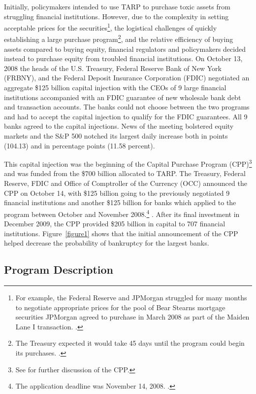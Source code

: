 \documentclass[12pt]{article}
\begin{document}
Initially, policymakers intended to use TARP to purchase toxic assets from struggling financial institutions. However, due to the complexity in setting acceptable prices for the securities\footnote{For example, the Federal Reserve and JPMorgan struggled for many months to negotiate appropriate prices for the pool of Bear Stearns mortgage securities JPMorgan agreed to purchase in March 2008 as part of the Maiden Lane I transaction. \citep{Geithner}.}, the logistical challenges of quickly establishing a large purchase program\footnote{The Treasury expected it would take 45 days until the program could begin its purchases. \citep{Geithner}.}, and the relative efficiency of buying assets compared to buying equity, financial regulators and policymakers decided instead to purchase equity from troubled financial institutions. On October 13, 2008 the heads of the U.S. Treasury, Federal Reserve Bank of New York (FRBNY), and the Federal Deposit Insurance Corporation (FDIC) negotiated an aggregate \$125 billion capital injection with the CEOs of 9 large financial institutions accompanied with an FDIC guarantee of new wholesale bank debt and transaction accounts. The banks could not choose between the two programs and had to accept the capital injection to qualify for the FDIC guarantees. All 9 banks agreed to the capital injections. News of the meeting bolstered equity markets and the S\&P 500 notched its largest daily increase both in points (104.13) and in percentage points (11.58 percent).

This capital injection was the beginning of the Capital Purchase Program (CPP)\footnote{See \citet{Ross2016b} for further discussion of the CPP.} and was funded from the \$700 billion allocated to TARP. The Treasury, Federal Reserve, FDIC and Office of Comptroller of the Currency (OCC) announced the CPP on October 14, with \$125 billion going to the previously negotiated 9 financial institutions and another \$125 billion for banks which applied to the program between October and November 2008.\footnote{The application deadline was November 14, 2008. \citep{CPPInstructions}.} \citep{Paulson}. After its final investment in December 2009, the CPP provided \$205 billion in capital to 707 financial institutions. Figure~\ref{figure1} shows that the initial announcement of the CPP helped decrease the probability of bankruptcy for the largest banks.

\subsection{Program Description}
\end{document}
